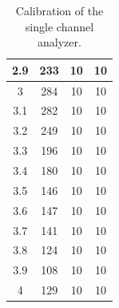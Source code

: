 \documentclass[a4paper]{report}
\numberwithin{equation}{section}
\begin{document}
\begin{table}[!ht]
\begin{tabular}{|c|c|c|c|}
        2.9 & 233 & 10 & 10 \\ \hline
        3 & 284 & 10 & 10 \\ \hline
        3.1 & 282 & 10 & 10 \\ \hline
        3.2 & 249 & 10 & 10 \\ \hline
        3.3 & 196 & 10 & 10 \\ \hline
        3.4 & 180 & 10 & 10 \\ \hline
        3.5 & 146 & 10 & 10 \\ \hline
        3.6 & 147 & 10 & 10 \\ \hline
        3.7 & 141 & 10 & 10 \\ \hline
        3.8 & 124 & 10 & 10 \\ \hline
        3.9 & 108 & 10 & 10 \\ \hline
        4 & 129 & 10 & 10 \\ \hline
    \end{tabular}
    \caption{Calibration of the single channel analyzer.}
    \label{calibration}
\end{table}
\end{document}
